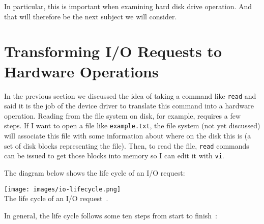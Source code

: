In particular, this is important when examining hard disk drive operation. And that will therefore be the next subject we will consider.

\section*{Transforming I/O Requests to Hardware Operations}

In the previous section we discussed the idea of taking a command like \texttt{read} and said it is the job of the device driver to translate this command into a hardware operation. Reading from the file system on disk, for example, requires a few steps. If I want to open a file like \texttt{example.txt}, the file system (not yet discussed) will associate this file with some information about where on the disk this is (a set of disk blocks representing the file). Then, to read the file, \texttt{read} commands can be issued to get those blocks into memory so I can edit it with \texttt{vi}.

The diagram below shows the life cycle of an I/O request:

\begin{center}
	\texttt{[image: images/io-lifecycle.png]}\\
	The life cycle of an I/O request~\cite{osc}.
\end{center}

In general, the life cycle follows some ten steps from start to finish~\cite{osc}:

